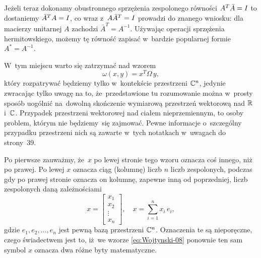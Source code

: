 \documentclass[a4paper,11pt]{article}
\begin{document}
Jeżeli teraz dokonamy obustronnego sprzężenia zespolonego równości
$A^{ T } \bar{A} = I$ to dostaniemy $\bar{A}^{ T } A = I$, co
wraz z~$A \bar{A}^{ T } = I$ prowadzi do znanego wniosku: dla
macierzy unitarnej $A$ zachodzi $\bar{A}^{ T } = A^{ -1 }$. Używając
operacji sprzężenia hermitowskiego, możemy tę równość zapisać w~bardzie
popularnej formie $A^{ * } = A^{ -1 }$.

\vspace{\spaceFour}





 W~tym miejscu warto się zatrzymać nad wzorem
\begin{equation}
  \label{eq:Wojtynski-07}
  \omega( x, y ) = x^{ T } \Omega \, y,
\end{equation}
który rozpatrywać będziemy tylko w~kontekście przestrzeni $\mathbb{C}^{ n }$,
jedynie zwracając tylko uwagę na to, że~przedstawione tu rozumowanie można
w~prosty sposób uogólnić na~dowolną skończenie wymiarową przestrzeń
wektorową nad $\mathbb{R}$ i~$\mathbb{C}$. Przypadek przestrzeni wektorowej nad ciałem
nieprzemiennym, to osoby problem, którym nie będziemy~się zajmować. Pewne
informacje o~szczególny przypadku przestrzeni nich są zawarte w~tych
notatkach w~uwagach do strony~39.

Po pierwsze zauważmy, że~$x$ po lewej stronie tego wzoru oznacza coś
innego, niż po prawej. Po lewej $x$ oznacza ciąg (kolumnę) liczb $n$ liczb
zespolonych, podczas gdy po prawej stronie oznacza on kolumnę, zapewne inną
od poprzedniej, liczb zespolonych daną zależnościami
\begin{equation}
  \label{eq:Wojtynski-08}
  x =
  \begin{bmatrix}
    x_{ 1 } \\
    x_{ 2 } \\
    \vdots \\
    x_{ n }
  \end{bmatrix}, \quad
  x = \sum_{ i = 1 }^{ n } x_{ i } \, e_{ i },
\end{equation}
gdzie $e_{ 1 }, e_{ 2 }, \ldots, e_{ n }$ jest pewną bazą przestrzeni $\mathbb{C}^{ n }$.
Oznaczenia te są nieporęczne, czego świadectwem jest to, iż~we wzorze
\eqref{eq:Wojtynski-08} ponownie ten sam symbol $x$ oznacza dwa różne
byty matematyczne.
\end{document}
